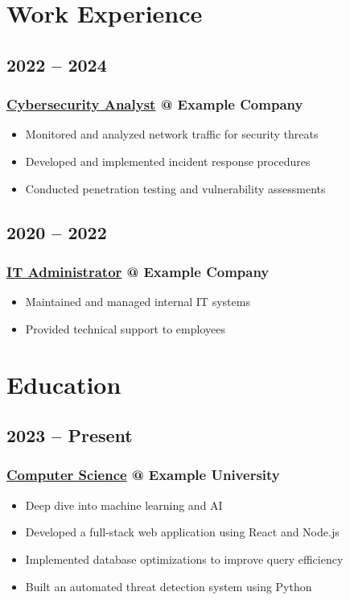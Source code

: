 \documentclass[a4paper,10pt]{article}
\makeatletter
\let\olditem\item
\renewcommand{\item}{\olditem \fontsize{4.2mm}{5.2mm}\selectfont}
\newcommand{\placeentry}[3]{\subsubsection{\fontsize{4.8mm}{0mm}\textbf{\color{primary} \href{#3}{#1} } \textbf{@} {\color{secondary} #2}}}
\makeatother
\begin{document}
\begin{minipage}[t][170mm]{0.63\textwidth} 
    \section{Work Experience}
    \subsection{2022 – 2024}
    \placeentry{Cybersecurity Analyst}{Example Company}{https://google.com}
    \begin{itemize}[noitemsep,topsep=0mm]
        \item Monitored and analyzed network traffic for security threats
        \item Developed and implemented incident response procedures
        \item Conducted penetration testing and vulnerability assessments
    \end{itemize}
    \subsection{2020 – 2022}
    \placeentry{IT Administrator}{Example Company}{https://google.com}
    \begin{itemize}[noitemsep,topsep=0mm]
        \item Maintained and managed internal IT systems
        \item Provided technical support to employees
    \end{itemize}

    \section{Education}
    \subsection{2023 – Present}
    \placeentry{Computer Science}{Example University}{https://google.com}
    \begin{itemize}[noitemsep,topsep=0mm]
        \item Deep dive into machine learning and AI
        \item Developed a full-stack web application using React and Node.js
        \item Implemented database optimizations to improve query efficiency
        \item Built an automated threat detection system using Python
    \end{itemize}
    \vspace{2mm}

\end{minipage}
\end{document}
